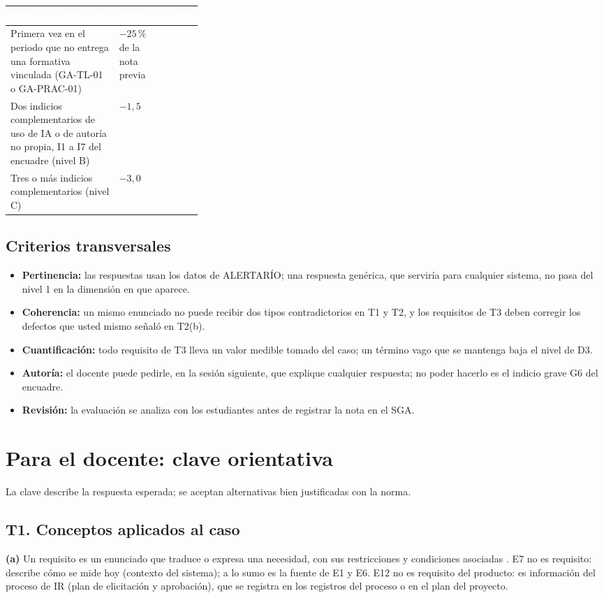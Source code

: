 \documentclass[11pt]{article}
\newif\ifclave
\newcommand{\thdr}[1]{\cellcolor{utegreen}\textcolor{white}{\textbf{#1}}}
\newcommand{\seccion}[1]{\section{\textcolor{utegreendk}{#1}}}
\newcommand{\subseccion}[1]{\subsection{\textcolor{midblue}{#1}}}
\begin{document}
	\noindent\begin{tabularx}{\linewidth}{|Y|C{0.22\linewidth}|C{0.10\linewidth}|}
		\hline
		\thdr{Situación detectada} & \thdr{Efecto} & \thdr{Aplica}\\
		\hline
		Primera vez en el periodo que no entrega una formativa vinculada (GA-TL-01 o GA-PRAC-01) & $-25\,\%$ de la nota previa & \\
		\hline
		 Dos indicios complementarios de uso de IA o de autoría no propia, I1 a I7 del encuadre (nivel B) & $-1{,}5$ & \\
		\hline
		Tres o más indicios complementarios (nivel C) & $-3{,}0$ & \\
		\hline
	\end{tabularx}
	
	\subseccion{Criterios transversales}
	
	\begin{itemize}[leftmargin=18pt,itemsep=2pt]
		\item \textbf{Pertinencia:} las respuestas usan los datos de ALERTARÍO; una respuesta genérica, que serviría para cualquier sistema, no pasa del nivel 1 en la dimensión en que aparece.
		\item \textbf{Coherencia:} un mismo enunciado no puede recibir dos tipos contradictorios en T1 y T2, y los requisitos de T3 deben corregir los defectos que usted mismo señaló en T2(b).
		\item \textbf{Cuantificación:} todo requisito de T3 lleva un valor medible tomado del caso; un término vago que se mantenga baja el nivel de D3.
		\item \textbf{Autoría:} el docente puede pedirle, en la sesión siguiente, que explique cualquier respuesta; no poder hacerlo es el indicio grave G6 del encuadre.
		\item \textbf{Revisión:} la evaluación se analiza con los estudiantes antes de registrar la nota en el SGA.
	\end{itemize}
	
	\ifclave
	\newpage
	\seccion{Para el docente: clave orientativa}
	
	La clave describe la respuesta esperada; se aceptan alternativas bien justificadas con la norma.
	
	\subseccion{T1. Conceptos aplicados al caso}
	
	\textbf{(a)} Un requisito es un enunciado que traduce o expresa una necesidad, con sus restricciones y condiciones asociadas \citep{iso29148_2018}. E7 no es requisito: describe cómo se mide hoy (contexto del sistema); a lo sumo es la fuente de E1 y E6. E12 no es requisito del producto: es información del proceso de IR (plan de elicitación y aprobación), que se registra en los registros del proceso o en el plan del proyecto.
	
\end{document}
